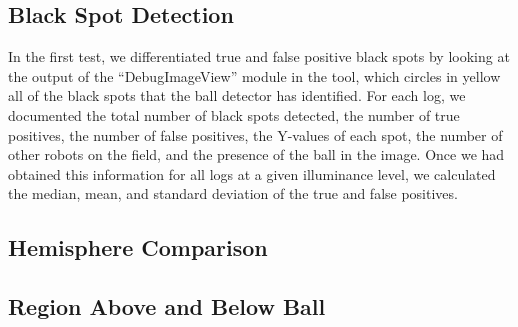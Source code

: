 \documentclass[11pt, twocolumn]{article}
\begin{document}
{\subsection{Black Spot Detection}
In the first test, we differentiated true and false positive black spots by looking at the output of the ``DebugImageView'' module in the tool, which circles in yellow all of the black spots that the ball detector has identified. For each log, we documented the total number of black spots detected, the number of true positives, the number of false positives, the Y-values of each spot, the number of other robots on the field, and the presence of the ball in the image. Once we had obtained this information for all logs at a given illuminance level, we calculated the median, mean, and standard deviation of the true and false positives.
\subsection{Hemisphere Comparison}
\subsection{Region Above and Below Ball}

}
\end{document}

